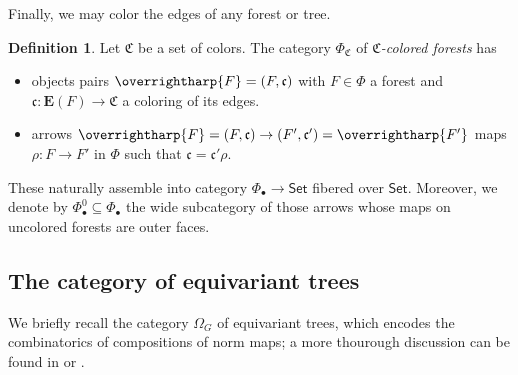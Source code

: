 \documentclass[a4paper,10pt
,draft
]{article}%
\numberwithin{equation}{section}
\numberwithin{figure}{section}
\theoremstyle{definition} %
\newtheorem{definition}[equation]{Definition}%
\newcommand{\vect}[1]{\text{\overrightharp{\ensuremath{#1}}}}
\newcommand{\Set}{\ensuremath{\mathsf{Set}}}
\newcommand{\1}{\ensuremath{\mathbbm 1}}%
\begin{document}
Finally, we may color the edges of any forest or tree.
\begin{definition}            
      Let $\mathfrak C$ be a set of colors.
      The category $\Phi_{\mathfrak C}$ of \textit{$\mathfrak C$-colored forests} has
      \begin{itemize}
      \item objects pairs $\vect F = (F, \mathfrak c)$ with
            $F \in \Phi$ a forest and
            $\mathfrak c \colon \boldsymbol{E}(F) \to \mathfrak C$ a coloring of its edges.
      \item arrows $\vect F = (F, \mathfrak c) \to (F', \mathfrak c') = \vect{F'}$ maps
            $\rho\colon F \to F'$ in $\Phi$ such that $\mathfrak c = \mathfrak c' \rho$.
      \end{itemize}      

      These naturally assemble into category $\Phi_\bullet \to \Set$ fibered over $\Set$.
      Moreover, we denote by
      $\Phi_\bullet^0 \subseteq \Phi_\bullet$
      the wide subcategory of those arrows whose maps on uncolored forests are outer faces.
\end{definition}

\subsection{The category of equivariant trees}

We briefly recall the category $\Omega_G$ of equivariant trees, which encodes the combinatorics of compositions of norm maps;
a more thourough discussion can be found in \cite{Per18} or \cite[\S 2]{BP_edss}.
\end{document}
